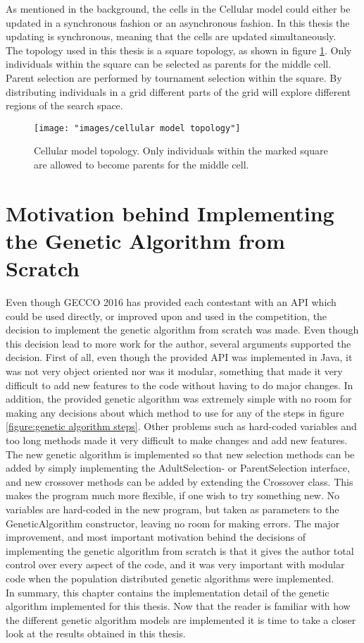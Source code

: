 \noindent As mentioned in the background, the cells in the Cellular model could either be updated in a synchronous fashion or an asynchronous fashion. In this thesis the updating is synchronous, meaning that the cells are updated simultaneously.\\


\noindent The topology used in this thesis is a square topology, as shown in figure \ref{figure:cellular model topology}. Only individuals within the square can be selected as parents for the middle cell. Parent selection are performed by tournament selection within the square. By distributing individuals in a grid different parts of the grid will explore different regions of the search space.\\


\begin{figure}
\centering
\texttt{[image: "images/cellular model topology"]}
\caption{Cellular model topology. Only individuals within the marked square are allowed to become parents for the middle cell.}
\label{figure:cellular model topology}
\end{figure}


\section{Motivation behind Implementing the Genetic Algorithm from Scratch}\label{section:motivation}
Even though GECCO	 2016 has provided each contestant with an API which could be used directly, or improved upon and used in the competition, the decision to implement the genetic algorithm from scratch was made. Even though this decision lead to more work for the author, several arguments supported the decision. First of all, even though the provided API was implemented in Java, it was not very object oriented nor was it modular, something that made it very difficult to add new features to the code without having to do major changes. In addition, the provided genetic algorithm was extremely simple with no room for making any decisions about which method to use for any of the steps in figure \ref{figure:genetic algorithm steps}. Other problems such as hard-coded variables and too long methods made it very difficult to make changes and add new features. \\

\noindent The new genetic algorithm is implemented so that new selection methods can be added by simply implementing the AdultSelection- or ParentSelection interface, and new crossover methods can be added by extending the Crossover class. This makes the program much more flexible, if one wish to try something new. No variables are hard-coded in the new program, but taken as parameters to the GeneticAlgorithm constructor, leaving no room for making errors. The major improvement, and most important motivation behind the decisions of implementing the genetic algorithm from scratch is that it gives the author total control over every aspect of the code, and it was very important with modular code when the population distributed genetic algorithms were implemented.\\

\noindent In summary, this chapter contains the implementation detail of the genetic algorithm implemented for this thesis. Now that the reader is familiar with how the different genetic algorithm models are implemented it is time to take a closer look at the results obtained in this thesis. \\